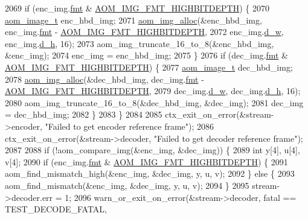 \begin{DoxyCodeInclude}
{{{{{{{{{{{{{{{{{{{{{{{{{{{{{{{{{{{{{{{{{{{{{2069     \textcolor{keywordflow}{if} (enc\_img.\hyperlink{structaom__image_a6c64b1ab918d80d52eb8f5d6d957e825}{fmt} & \hyperlink{aom__image_8h_a607b37d91f75442f54223ecd85f1b6cb}{AOM\_IMG\_FMT\_HIGHBITDEPTH}) \{
2070       \hyperlink{structaom__image}{aom\_image\_t} enc\_hbd\_img;
2071       \hyperlink{aom__image_8h_a570db29fbd122951235a08fe9375f6bb}{aom\_img\_alloc}(&enc\_hbd\_img, enc\_img.\hyperlink{structaom__image_a6c64b1ab918d80d52eb8f5d6d957e825}{fmt} - 
      \hyperlink{aom__image_8h_a607b37d91f75442f54223ecd85f1b6cb}{AOM\_IMG\_FMT\_HIGHBITDEPTH},
2072                     enc\_img.\hyperlink{structaom__image_a89f80b1f58d608b9d2080635f4359034}{d\_w}, enc\_img.\hyperlink{structaom__image_ab986419a1f0fff93a2dc505f47194988}{d\_h}, 16);
2073       aom\_img\_truncate\_16\_to\_8(&enc\_hbd\_img, &enc\_img);
2074       enc\_img = enc\_hbd\_img;
2075     \}
2076     \textcolor{keywordflow}{if} (dec\_img.\hyperlink{structaom__image_a6c64b1ab918d80d52eb8f5d6d957e825}{fmt} & \hyperlink{aom__image_8h_a607b37d91f75442f54223ecd85f1b6cb}{AOM\_IMG\_FMT\_HIGHBITDEPTH}) \{
2077       \hyperlink{structaom__image}{aom\_image\_t} dec\_hbd\_img;
2078       \hyperlink{aom__image_8h_a570db29fbd122951235a08fe9375f6bb}{aom\_img\_alloc}(&dec\_hbd\_img, dec\_img.\hyperlink{structaom__image_a6c64b1ab918d80d52eb8f5d6d957e825}{fmt} - 
      \hyperlink{aom__image_8h_a607b37d91f75442f54223ecd85f1b6cb}{AOM\_IMG\_FMT\_HIGHBITDEPTH},
2079                     dec\_img.\hyperlink{structaom__image_a89f80b1f58d608b9d2080635f4359034}{d\_w}, dec\_img.\hyperlink{structaom__image_ab986419a1f0fff93a2dc505f47194988}{d\_h}, 16);
2080       aom\_img\_truncate\_16\_to\_8(&dec\_hbd\_img, &dec\_img);
2081       dec\_img = dec\_hbd\_img;
2082     \}
2083   \}
2084 
2085   ctx\_exit\_on\_error(&stream->encoder, \textcolor{stringliteral}{"Failed to get encoder reference frame"});
2086   ctx\_exit\_on\_error(&stream->decoder, \textcolor{stringliteral}{"Failed to get decoder reference frame"});
2087 
2088   \textcolor{keywordflow}{if} (!aom\_compare\_img(&enc\_img, &dec\_img)) \{
2089     \textcolor{keywordtype}{int} y[4], u[4], v[4];
2090     \textcolor{keywordflow}{if} (enc\_img.\hyperlink{structaom__image_a6c64b1ab918d80d52eb8f5d6d957e825}{fmt} & \hyperlink{aom__image_8h_a607b37d91f75442f54223ecd85f1b6cb}{AOM\_IMG\_FMT\_HIGHBITDEPTH}) \{
2091       aom\_find\_mismatch\_high(&enc\_img, &dec\_img, y, u, v);
2092     \} \textcolor{keywordflow}{else} \{
2093       aom\_find\_mismatch(&enc\_img, &dec\_img, y, u, v);
2094     \}
2095     stream->decoder.err = 1;
2096     warn\_or\_exit\_on\_error(&stream->decoder, fatal == TEST\_DECODE\_FATAL,
}}}}}}}}}}}}}}}}}}}}}}}}}}}}}}}}}}}}}}}}}}}}}
\end{DoxyCodeInclude}
